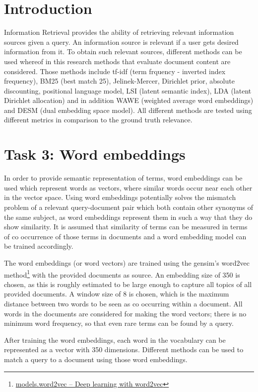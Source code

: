 \documentclass{article}
\begin{document}
\section{Introduction}
Information Retrieval provides the ability of retrieving relevant information sources given a query. An information source is relevant if a user gets desired information from it. To obtain such relevant sources, different methods can be used whereof in this research methods that evaluate document content are considered. Those methods include tf-idf (term frquency - inverted index frequency), BM25 (best match 25), Jelinek-Mercer, Dirichlet prior, absolute discounting, positional language model, LSI (latent semantic index), LDA (latent Dirichlet allocation) and in addition WAWE (weighted average word embeddings) and DESM (dual embedding space model). All different methods are tested using different metrics in comparison to the ground truth relevance.





\section{Task 3: Word embeddings}
In order to provide semantic representation of terms, word embeddings can be used which represent words as vectors, where similar words occur near each other in the vector space. Using word embeddings potentially solves the mismatch problem of a relevant query-document pair which both contain other synonyms of the same subject, as word embeddings represent them in such a way that they do show similarity. It is assumed that similarity of terms can be measured in terms of co occurrence of those terms in documents and a word embedding model can be trained accordingly.

The word embeddings (or word vectors) are trained using the gensim's word2vec method\footnote{\href{https://radimrehurek.com/gensim/models/word2vec.html}{models.word2vec – Deep learning with word2vec}} with the provided documents as source. An embedding size of 350 is chosen, as this is roughly estimated to be large enough to capture all topics of all provided documents. A window size of 8 is chosen, which is the maximum distance between two words to be seen as co occurring within a document. All words in the documents are considered for making the word vectors; there is no minimum word frequency, so that even rare terms can be found by a query.

After training the word embeddings, each word in the vocabulary can be represented as a vector with 350 dimensions. Different methods can be used to match a query to a document using those word embeddings.
\end{document}
